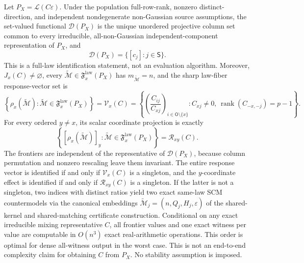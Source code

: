 Let \(P_X=\mathcal L(C\varepsilon)\). Under the population full-row-rank, nonzero distinct-direction, and independent nondegenerate non-Gaussian source assumptions, the set-valued functional \(\mathcal D(P_X)\) is the unique unordered projective column set common to every irreducible, all-non-Gaussian independent-component representation of \(P_X\), and
\[
 \mathcal D(P_X)=\{[c_j]:j\in\mathsf S\}.
\]
This is a full-law identification statement, not an evaluation algorithm. Moreover, \(J_x(C)\ne\varnothing\), every \(\widetilde{\mathcal M}\in\mathfrak F_x^{\mathrm{law}}(P_X)\) has \(m_{\widetilde{\mathcal M}}=n\), and the sharp law-fiber response-vector set is
\[
 \left\{\rho_x(\widetilde{\mathcal M}):\widetilde{\mathcal M}\in\mathfrak F_x^{\mathrm{law}}(P_X)\right\}
 =\mathcal V_x(C)
 =\left\{\left(\frac{C_{ij}}{C_{xj}}\right)_{i\in\mathsf O\setminus\{x\}}:C_{xj}\ne0,\ \operatorname{rank}(C_{-x,-j})=p-1\right\}.
\]
For every ordered \(y\ne x\), its scalar coordinate projection is exactly
\[
 \left\{[\rho_x(\widetilde{\mathcal M})]_y:\widetilde{\mathcal M}\in\mathfrak F_x^{\mathrm{law}}(P_X)\right\}
 =\mathcal R_{xy}(C).
\]
The frontiers are independent of the representative of \(\mathcal D(P_X)\), because column permutation and nonzero rescaling leave them invariant. The entire response vector is identified if and only if \(\mathcal V_x(C)\) is a singleton, and the \(y\)-coordinate effect is identified if and only if \(\mathcal R_{xy}(C)\) is a singleton. If the latter is not a singleton, two indices with distinct ratios yield two exact same-law SCM countermodels via the canonical embeddings \(\widetilde{\mathcal M}_j=(n,Q_j,H_j,\varepsilon)\) of the shared-kernel and shared-matching certificate construction. Conditional on any exact irreducible mixing representative \(C\), all frontier values and one exact witness per value are computable in \(O(n^3)\) exact real-arithmetic operations. This order is optimal for dense all-witness output in the worst case. This is not an end-to-end complexity claim for obtaining \(C\) from \(P_X\). No stability assumption is imposed.